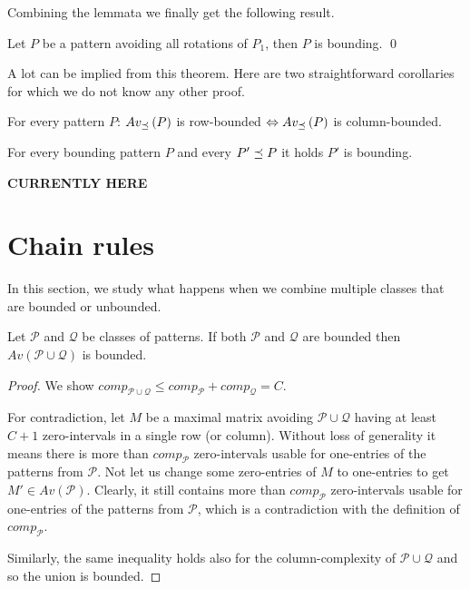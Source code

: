 Combining the lemmata we finally get the following result.

\begin{thm}
Let $P$ be a pattern avoiding all rotations of $P_1$, then $P$ is bounding. \qed
\end{thm}

A lot can be implied from this theorem. Here are two straightforward corollaries for which we do not know any other proof.

\begin{cor}
For every pattern $P$: $Av_{\preceq}\left(P\right)$ is row-bounded $\Leftrightarrow Av_{\preceq}\left(P\right)$ is column-bounded.
\end{cor}

\begin{cor}
For every bounding pattern $P$ and every $P'\preceq P$ it holds $P'$ is bounding.
\end{cor}

\textbf{CURRENTLY HERE}

\section{Chain rules}
In this section, we study what happens when we combine multiple classes that are bounded or unbounded.

\begin{thm}
\label{thm:boundunion}
Let $\mathcal{P}$ and $\mathcal{Q}$ be classes of patterns. If both $\mathcal{P}$ and $\mathcal{Q}$ are bounded then $Av(\mathcal{P}\cup\mathcal{Q})$ is bounded.
\end{thm}
\begin{proof}
We show $comp_{\mathcal{P}\cup\mathcal{Q}}\leq comp_\mathcal{P}+comp_\mathcal{Q}=C$.

For contradiction, let $M$ be a maximal matrix avoiding $\mathcal{P}\cup\mathcal{Q}$ having at least $C+1$ zero-intervals in a single row (or column). Without loss of generality it means there is more than $comp_\mathcal{P}$ zero-intervals usable for one-entries of the patterns from $\mathcal{P}$. Not let us change some zero-entries of $M$ to one-entries to get $M'\in Av(\mathcal{P})$. Clearly, it still contains more than $comp_\mathcal{P}$ zero-intervals usable for one-entries of the patterns from $\mathcal{P}$, which is a contradiction with the definition of $comp_\mathcal{P}$.

Similarly, the same inequality holds also for the column-complexity of $\mathcal{P}\cup\mathcal{Q}$ and so the union is bounded.
\end{proof}

